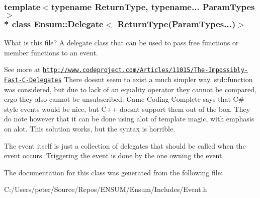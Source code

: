 \subsubsection*{template$<$typename Return\+Type, typename... Param\+Types$>$\\*
class Ensum\+::\+Delegate$<$ Return\+Type(\+Param\+Types...)$>$}

What is this file? A delegate class that can be used to pass free functions or member functions to an event. 

See more at \href{http://www.codeproject.com/Articles/11015/The-Impossibly-Fast-C-Delegates}{\tt http\+://www.\+codeproject.\+com/\+Articles/11015/\+The-\/\+Impossibly-\/\+Fast-\/\+C-\/\+Delegates} There doesn\textquotesingle{}t seem to exist a much simpler way. std\+::function was considered, but due to lack of an equality operator they cannot be compared, ergo they also cannot be unsubscribed. Game Coding Complete says that C\#-\/style events would be nice, but C++ doesn\textquotesingle{}t support them out of the box. They do note however that it can be done using alot of template magic, with emphasis on alot. This solution works, but the syntax is horrible.

The event itself is just a collection of delegates that should be called when the event occurs. Triggering the event is done by the one owning the event. 

The documentation for this class was generated from the following file\+:\begin{DoxyCompactItemize}
\item 
C\+:/\+Users/peter/\+Source/\+Repos/\+E\+N\+S\+U\+M/\+Ensum/\+Includes/Event.\+h\end{DoxyCompactItemize}
